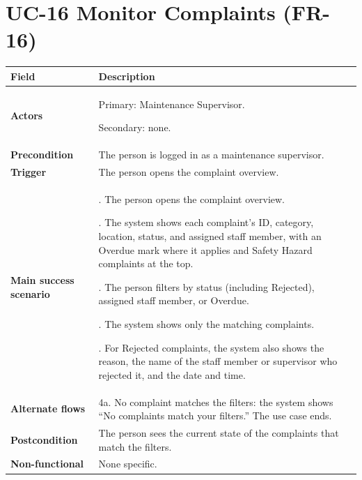 \documentclass[11pt,a4paper]{report}
\begin{document}
\section{UC-16 Monitor Complaints (FR-16)}
\begin{longtable}{|>{\raggedright\arraybackslash}p{3.0cm}|>{\raggedright\arraybackslash}p{12.4cm}|}
\hline \textbf{Field} & \textbf{Description} \\ \hline \endhead
\textbf{Actors} & Primary: Maintenance Supervisor.\par\smallskip Secondary: none. \\ \hline
\textbf{Precondition} & The person is logged in as a maintenance supervisor. \\ \hline
\textbf{Trigger} & The person opens the complaint overview. \\ \hline
\textbf{Main success scenario} & 1. The person opens the complaint overview.\par\smallskip 2. The system shows each complaint's ID, category, location, status, and assigned staff member, with an Overdue mark where it applies and Safety Hazard complaints at the top.\par\smallskip 3. The person filters by status (including Rejected), assigned staff member, or Overdue.\par\smallskip 4. The system shows only the matching complaints.\par\smallskip 5. For Rejected complaints, the system also shows the reason, the name of the staff member or supervisor who rejected it, and the date and time. \\ \hline
\textbf{Alternate flows} & 4a. No complaint matches the filters: the system shows ``No complaints match your filters.'' The use case ends. \\ \hline
\textbf{Postcondition} & The person sees the current state of the complaints that match the filters. \\ \hline
\textbf{Non-functional} & None specific. \\ \hline
\end{longtable}
\end{document}
